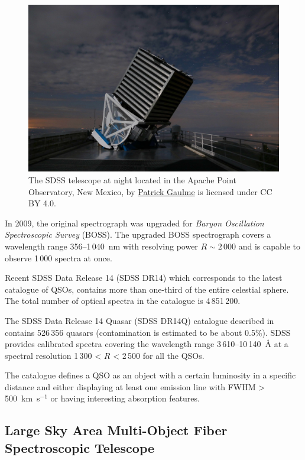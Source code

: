 \begin{figure}
\includegraphics[width=\textwidth]{img/sdss_gaulme.jpg}
\caption[The SDSS telescope at night]{
	The SDSS telescope at night located in the Apache Point Observatory, New Mexico, by \href{https://www.sdss.org/wp-content/uploads/2016/07/sdss_gaulme1.jpg}{Patrick Gaulme} is licensed under CC BY 4.0.
	}
\label{sdss_telescope}
\end{figure}

In 2009, the original spectrograph was upgraded for \textit{Baryon Oscillation Spectroscopic Survey} (BOSS).
The upgraded BOSS spectrograph covers a wavelength range 356--1\,040~nm
with resolving power \(R \sim 2\,000\)
and is capable to observe 1\,000 spectra at once.~\cite{smee2013}

Recent SDSS Data Release 14 (SDSS DR14) which corresponds to the latest catalogue of QSOs,
contains more than one-third of the entire celestial sphere.
The total number of optical spectra in the catalogue is 4\,851\,200.

The SDSS Data Release 14 Quasar (SDSS DR14Q) catalogue described in~\cite{paris2018} contains 526\,356 quasars
(contamination is estimated to be about 0.5\%).
SDSS provides calibrated spectra covering the wavelength range 3\,610--10\,140~\AA{} at a spectral resolution 1\,300 < \(R\) < 2\,500 for all the QSOs.

The catalogue defines a QSO as an object with a certain luminosity in a specific distance
and either displaying at least one emission line with FWHM > 500~km~s\(^{-1}\)
or having interesting absorption features.

\subsection{Large Sky Area Multi-Object Fiber Spectroscopic Telescope}
\label{lamost}

